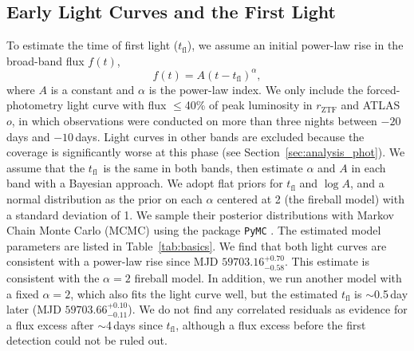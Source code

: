 \documentclass[twocolumn]{aastex631}
\newcommand{\tfl}{$t_\mathrm{fl}$}
\begin{document}
\begin{CJK*}{UTF8}{gbsn}
\subsection{Early Light Curves and the First Light}
To estimate the time of first light ($t_\mathrm{fl}$), we assume an initial power-law rise in the broad-band flux $f(t)$,
$$
f(t) = A (t-t_\mathrm{fl})^\alpha,
$$
where $A$ is a constant and $\alpha$ is the power-law index. We only include the forced-photometry light curve with flux $\le$40\% of peak luminosity \citep{Miller_ZTF_2020} in $r_\mathrm{ZTF}$ and ATLAS $o$, in which observations were conducted on more than three nights between $-20$\,days and $-10$\,days. Light curves in other bands are excluded because the coverage is significantly worse at this phase (see Section~\ref{sec:analysis_phot}). We assume that the \tfl\ is the same in both bands, then estimate $\alpha$ and $A$ in each band with a Bayesian approach. We adopt flat priors for $t_\mathrm{fl}$ and $\log A$, and a normal distribution as the prior on each $\alpha$ centered at 2 (the fireball model) with a standard deviation of 1. We sample their posterior distributions with Markov Chain Monte Carlo (MCMC) using the package \texttt{PyMC} \citep{pymc_2016}. The estimated model parameters are listed in Table~\ref{tab:basics}. We find that both light curves are consistent with a power-law rise since MJD $59703.16^{+0.70}_{-0.58}$. %
This estimate is consistent with the $\alpha=2$ fireball model. In addition, we run another model with a fixed $\alpha=2$, which also fits the light curve well, but the estimated $t_\mathrm{fl}$ is $\sim$0.5\,day later (MJD $59703.66_{-0.11}^{+0.10}$). We do not find any correlated residuals as evidence for a flux excess after $\sim$4\,days since $t_\mathrm{fl}$, although a flux excess before the first detection could not be ruled out.



\end{CJK*}
\end{document}
